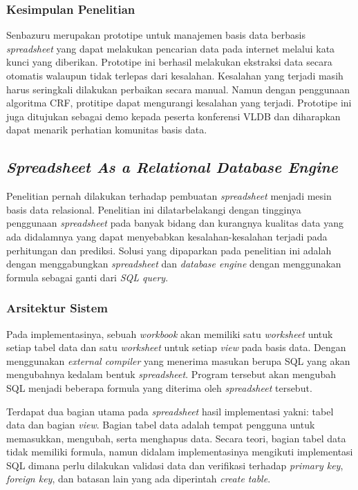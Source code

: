     \subsubsection{Kesimpulan Penelitian}
    Senbazuru merupakan prototipe untuk manajemen basis data berbasis \textit{spreadsheet} yang dapat melakukan pencarian data pada internet melalui kata kunci yang diberikan. Prototipe ini berhasil melakukan ekstraksi data secara otomatis walaupun tidak terlepas dari kesalahan. Kesalahan yang terjadi masih harus seringkali dilakukan perbaikan secara manual. Namun dengan penggunaan algoritma CRF, protitipe dapat mengurangi kesalahan yang terjadi. Prototipe ini juga ditujukan sebagai demo kepada peserta konferensi VLDB dan diharapkan dapat menarik perhatian komunitas basis data.

\subsection{\textit{Spreadsheet As a Relational Database Engine}}
Penelitian \citep{Tyszkiewicz2010} pernah dilakukan terhadap pembuatan \textit{spreadsheet} menjadi mesin basis data relasional. Penelitian ini dilatarbelakangi dengan tingginya penggunaan \textit{spreadsheet} pada banyak bidang dan kurangnya kualitas data yang ada didalamnya yang dapat menyebabkan kesalahan-kesalahan terjadi pada perhitungan dan prediksi. Solusi yang dipaparkan pada penelitian ini adalah dengan menggabungkan \textit{spreadsheet} dan \textit{database engine} dengan menggunakan formula sebagai ganti dari \textit{SQL query}.

    \subsubsection{Arsitektur Sistem}

    Pada implementasinya, sebuah \textit{workbook} akan memiliki satu \textit{worksheet} untuk setiap tabel data dan satu \textit{worksheet} untuk setiap \textit{view} pada basis data. Dengan menggunakan \textit{external compiler} yang menerima masukan berupa SQL yang akan mengubahnya kedalam bentuk \textit{spreadsheet}. Program tersebut akan mengubah SQL menjadi beberapa formula yang diterima oleh \textit{spreadsheet} tersebut.

    Terdapat dua bagian utama pada \textit{spreadsheet} hasil implementasi yakni: tabel data dan bagian \textit{view}. Bagian tabel data adalah tempat pengguna untuk memasukkan, mengubah, serta menghapus data. Secara teori, bagian tabel data tidak memiliki formula, namun didalam implementasinya mengikuti implementasi SQL dimana perlu dilakukan validasi data dan verifikasi terhadap \textit{primary key}, \textit{foreign key}, dan batasan lain yang ada diperintah \textit{create table}. 

